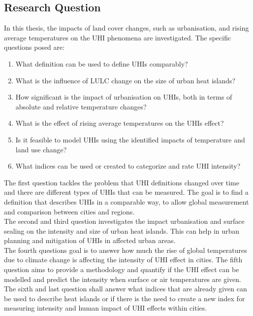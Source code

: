 \documentclass[12pt,a4paper, english]{article}
\begin{document}
 \subsection{Research Question}
  In this thesis, the impacts of land cover changes, such as urbanisation, and rising average temperatures on the \gls{UHI} phenomena are investigated.
  The specific questions posed are:
  \begin{enumerate}
    \item What definition can be used to define \glspl{UHI} comparably?\label{q1}
    \item What is the influence of \gls{LULC} change on the size of urban heat islands?\label{q2}
    \item How significant is the impact of urbanisation on \glspl{UHI}, both in terms of absolute and relative temperature changes?\label{q3}
    \item What is the effect of rising average temperatures on the \glspl{UHI} effect?\label{q4}
    \item Is it feasible to model \glspl{UHI} using the identified impacts of temperature and land use change?\label{q5}
    \item What indices can be used or created to categorize and rate \gls{UHI} intensity?\label{q6}
  \end{enumerate}
  The first question tackles the problem that \gls{UHI} definitions changed over time and there are different types of \glspl{UHI} that can be measured. The goal is to find a definition that describes \glspl{UHI} in a comparable way, to allow global measurement and comparison between cities and regions.\\ 
  The second and third question investigates the impact urbanisation and surface sealing on the intensity and size of urban heat islands. This can help in urban planning and mitigation of \glspl{UHI} in affected urban areas.\\ %
  The fourth questions goal is to answer how much the rise of global temperatures due to climate change is affecting the intensity of \gls{UHI} effect in cities.%
  The fifth question aims to provide a methodology and quantify if the \gls{UHI} effect can be modelled and predict the intensity when surface or air temperatures are given. 
  The sixth and last question shall answer what indices that are already given can be used to describe heat islands or if there is the need to create a new index for measuring intensity and human impact of \gls{UHI} effects within cities.
\end{document}
